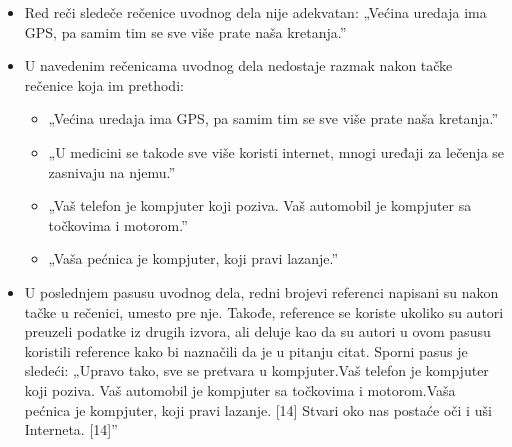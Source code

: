 \documentclass[a4paper]{report}
\newcommand{\odgovor}[1]{\textcolor{blue}{#1}}
\begin{document}
\begin{itemize}
    \item Red reči sledeče rečenice uvodnog dela nije adekvatan:\newline
    „Većina uredaja ima GPS, pa samim tim se sve više prate naša kretanja.”
\end{itemize}
\begin{itemize}
    \item U navedenim rečenicama uvodnog dela nedostaje razmak nakon tačke rečenice koja im prethodi:
    \begin{itemize}
        \item „Većina uredaja ima GPS, pa samim tim se sve više prate naša kretanja.”
        
        \odgovor{}
                
    \end{itemize}
    \begin{itemize}
        \item „U medicini se takode sve više koristi internet, mnogi uređaji za lečenja se zasnivaju na njemu.”
        
        \odgovor{}
        
    \end{itemize}
    \begin{itemize}
        \item „Vaš telefon je kompjuter koji poziva. Vaš automobil je kompjuter sa točkovima i motorom.”
        
        \odgovor{}
        
        
    \end{itemize}
        \begin{itemize}
        \item „Vaša pećnica je kompjuter, koji pravi lazanje.”
        
        \odgovor{}
        
        
    \end{itemize}
\end{itemize}
\begin{itemize}
    \item U poslednjem pasusu uvodnog dela, redni brojevi referenci napisani su nakon tačke u rečenici, umesto pre nje. Takođe, reference se koriste ukoliko su autori preuzeli podatke iz drugih izvora, ali deluje kao da su autori u ovom pasusu koristili reference kako bi naznačili da je u pitanju citat. Sporni pasus je sledeći: \newline
    „Upravo tako, sve se pretvara u kompjuter.Vaš telefon je kompjuter koji poziva. Vaš automobil je kompjuter sa točkovima i motorom.Vaša pećnica je kompjuter, koji pravi lazanje. [14] Stvari oko nas postaće oči i uši Interneta. [14]”
    
    \odgovor{}
    
    
\end{itemize}
\end{document}
